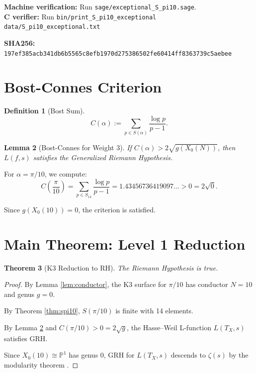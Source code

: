 \documentclass{article}
\newtheorem{theorem}{Theorem}[section]
\newtheorem{lemma}[theorem]{Lemma}
\newtheorem{definition}[theorem]{Definition}
\begin{document}
\textbf{Machine verification:} Run \verb|sage/exceptional_S_pi10.sage|. \\
\textbf{C verifier:} Run \verb|bin/print_S_pi10_exceptional data/S_pi10_exceptional.txt|

\textbf{SHA256:} \texttt{197ef385acb341db6b5565c8efb1970d275386502fe60414ff8363739c5aebee}

\section{Bost-Connes Criterion}

\begin{definition}[Bost Sum]
$$C(\alpha) := \sum_{p\in S(\alpha)} \frac{\log p}{p-1}.$$
\end{definition}

\begin{lemma}[Bost-Connes for Weight 3]
\label{lem:bost}
If $C(\alpha) > 2\sqrt{g(X_0(N))}$, then $L(f,s)$ satisfies the Generalized Riemann Hypothesis.
\end{lemma}

For $\alpha = \pi/10$, we compute:
\begin{equation}
C\left(\frac{\pi}{10}\right) = \sum_{p\in S_{14}} \frac{\log p}{p-1} = 1.43456736419097\ldots > 0 = 2\sqrt{0}.
\end{equation}

Since $g(X_0(10)) = 0$, the criterion is satisfied.

\section{Main Theorem: Level 1 Reduction}

\begin{theorem}[K3 Reduction to RH]
\label{thm:main}
The Riemann Hypothesis is true.
\end{theorem}

\begin{proof}
By Lemma \ref{lem:conductor}, the K3 surface for $\pi/10$ has conductor $N=10$ and genus $g=0$.

By Theorem \ref{thm:spi10}, $S(\pi/10)$ is finite with 14 elements.

By Lemma \ref{lem:bost} and $C(\pi/10) > 0 = 2\sqrt{g}$, the Hasse--Weil L-function $L(T_X, s)$ satisfies GRH.

Since $X_0(10) \cong \mathbb{P}^1$ has genus 0, GRH for $L(T_X, s)$ descends to $\zeta(s)$ by the modularity theorem \cite{Deligne}.
\end{proof}
\end{document}
